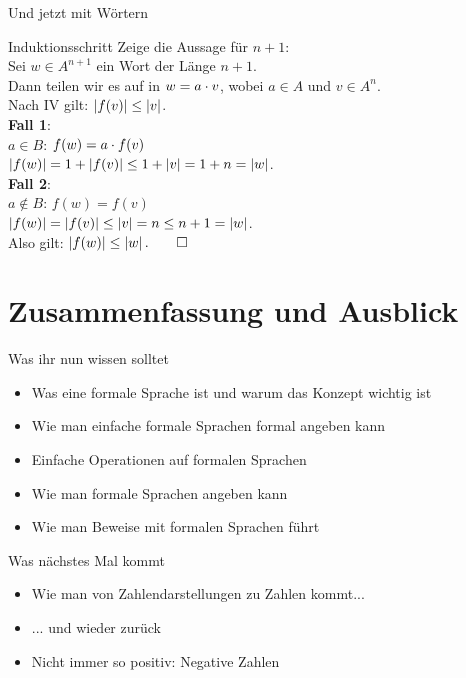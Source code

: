 \begin{frame}{Und jetzt mit Wörtern}
	\begin{block}{Induktionsschritt}
		Zeige die Aussage für $n+1$:\\
		Sei $w \in A^{n+1}$ ein Wort der Länge $n+1$.\\
		\pause
		Dann teilen wir es auf in $w = a \cdot v$, wobei $a \in A$ und $v \in A^n$.\\
		Nach IV gilt: $\left\lvert f(v) \right\rvert \le \left\lvert v \right\rvert$.\\
		\pause
		\smallskip
		\textbf{Fall 1}: \\
			\quad $a \in B$: $f(w) = a \cdot f(v)$ \\
			\quad \impl $\left\lvert f(w) \right\rvert = 1 + \left\lvert f(v) \right\rvert \le 1 + \left\lvert v \right\rvert = 1+n = \left\lvert w \right\rvert$.\\
		\pause
		\smallskip
		\textbf{Fall 2}: \\
			\quad $a \notin B$: $f(w) = f(v)$ \\
			\quad \impl $\left\lvert f(w) \right\rvert = \left\lvert f(v) \right\rvert \le \left\lvert v \right\rvert = n \le n+1 = \left\lvert w \right\rvert$.\\
		\pause
		\smallskip
		Also gilt: $\left\lvert f(w) \right\rvert \le \left\lvert w \right\rvert. \qed$
	\end{block}
\end{frame}

\section{Zusammenfassung und Ausblick}

\begin{frame}	
	\begin{block}{Was ihr nun wissen solltet}
		\begin{itemize}
			\item Was eine formale Sprache ist und warum das Konzept wichtig ist
			\item Wie man einfache formale Sprachen formal angeben kann
			\item Einfache Operationen auf formalen Sprachen
			\item Wie man formale Sprachen angeben kann
			\item Wie man Beweise mit formalen Sprachen führt
		\end{itemize}
	\end{block}
	
	\begin{block}{Was nächstes Mal kommt}
		\begin{itemize}
			\item Wie man von Zahlendarstellungen zu Zahlen kommt...
			\item[] ... und wieder zurück
			\item Nicht immer so positiv: Negative Zahlen
		\end{itemize}
	\end{block}
\end{frame}







\backupend


